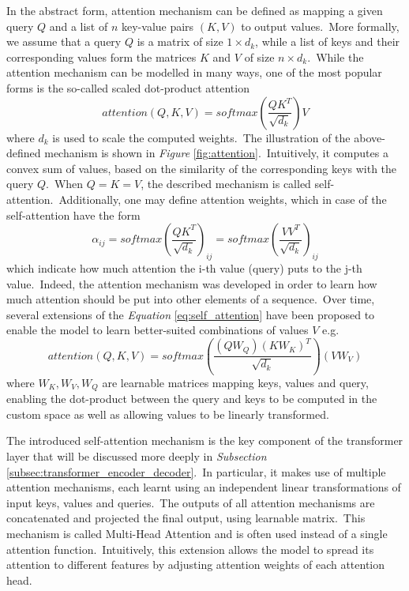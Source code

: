 \documentclass[longabstract, english, mgr]{iithesis}
\theoremstyle{default_theorem_style}\newtheorem{theorem}{Theorem}
\theoremstyle{default_theorem_style}\newtheorem{definition}{Definition}
\begin{document}
In the abstract form, attention mechanism can be defined as mapping a given query $Q$ and a list of $n$ key-value pairs
$(K, V)$ to output values.\ More formally, we assume that a query $Q$ is a matrix of size $1 \times d_k$, while
a list of keys and their corresponding values form the matrices $K$ and $V$ of size $n \times d_k$.\ While
the attention mechanism can be modelled in many ways, one of the most popular forms is the so-called scaled
dot-product attention
\begin{equation}\label{eq:self_attention}
attention(Q, K, V) = softmax(\frac{Q K^T}{\sqrt{d_k}}) V
\end{equation}
where $d_k$ is used to scale the computed weights.\ The illustration of the above-defined mechanism is shown in
\textit{Figure} \ref{fig:attention}.\ Intuitively, it computes a convex sum of values, based on the similarity of
the corresponding keys with the query $Q$.\ When $Q = K = V$, the described mechanism is called
self-attention.\ Additionally, one may define attention weights, which in case of the self-attention have the form
$$
\alpha_{ij} = softmax(\frac{Q K^T}{\sqrt{d_k}})_{ij} = softmax(\frac{V V^T}{\sqrt{d_k}})_{ij}
$$
which indicate how much attention the i-th value (query) puts to the j-th value.\ Indeed, the attention mechanism
was developed in order to learn how much attention should be put into other elements of a sequence.\ Over
time, several extensions of the \textit{Equation} \ref{eq:self_attention} have been proposed to enable the model to
learn better-suited combinations of values $V$ e.g.\
$$
attention(Q, K, V) = softmax(\frac{(Q W_Q) (K W_K)^T}{\sqrt{d_k}}) (V W_V)
$$
where $W_K, W_V, W_Q$ are learnable matrices mapping keys, values and query, enabling the dot-product between the
query and keys to be computed in the custom space as well as allowing values to be linearly transformed.\newline

\noindent The introduced self-attention mechanism is the key component of the transformer layer that will be discussed
more deeply in \textit{Subsection} \ref{subsec:transformer_encoder_decoder}.\ In particular, it makes use of
multiple attention mechanisms, each learnt using an independent linear transformations
of input keys, values and queries.\ The outputs of all attention mechanisms are concatenated and projected the
final output, using learnable matrix.\ This mechanism is called Multi-Head Attention and is often used instead
of a single attention function.\ Intuitively, this extension allows the model to spread its
attention to different features by adjusting attention weights of each attention head.
\end{document}
